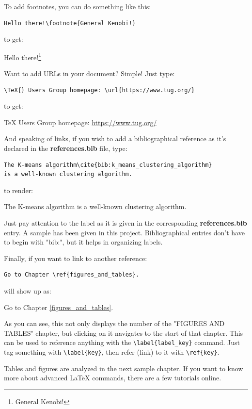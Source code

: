 \documentclass[en,inscr,ack,preface]{dimscthesis}
\begin{document}
To add footnotes, you can do something like this:

\begin{verbatim}
Hello there!\footnote{General Kenobi!}
\end{verbatim}

to get:

Hello there!\footnote{General Kenobi!}

Want to add URLs in your document? Simple! Just type:

\begin{verbatim}
\TeX{} Users Group homepage: \url{https://www.tug.org/}
\end{verbatim}

to get:

\TeX{} Users Group homepage: \url{https://www.tug.org/}

And speaking of links, if you wish to add a bibliographical reference as it's declared in the \textbf{references.bib} file, type:

\begin{verbatim}
The K-means algorithm\cite{bib:k_means_clustering_algorithm}
is a well-known clustering algorithm.
\end{verbatim}

to render:

The K-means algorithm\cite{bib:k_means_clustering_algorithm}
is a well-known clustering algorithm.

Just pay attention to the label as it is given in the corresponding \textbf{references.bib} entry.
A sample has been given in this project.
Bibliographical entries don't have to begin with "bib:", but it helps in organizing labels.

Finally, if you want to link to another reference:
\begin{verbatim}
Go to Chapter \ref{figures_and_tables}.
\end{verbatim}

will show up as:

Go to Chapter \ref{figures_and_tables}.

As you can see, this not only displays the number of the "FIGURES AND TABLES" chapter, but clicking on it navigates to the start of that chapter.
This can be used to reference anything with the \verb|\label{label_key}| command.
Just tag something with \verb|\label{key}|, then refer (link) to it with \verb|\ref{key}|.

Tables and figures are analyzed in the next sample chapter.
If you want to know more about advanced \LaTeX{} commands, there are a few tutorials online.
\end{document}
